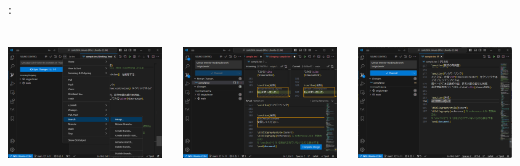 \documentclass[aspectratio=169,dvipdfmx,cjk]{beamer}
\begin{document}
\begin{frame}{\insertsection \thesubsection: \insertsubsection}
\begin{columns}
\begin{column}{0.23\textwidth}
      \includegraphics[width=1.0\linewidth]{fig/git-marge.png}
    \end{column}
    \begin{column}{0.23\textwidth}
      \includegraphics[width=1.0\linewidth]{fig/git-editor.png}
    \end{column}
    \begin{column}{0.23\textwidth}
      \includegraphics[width=1.0\linewidth]{fig/git-solve-conflict.png}

\end{column}
\end{columns}
\end{frame}
\end{document}
